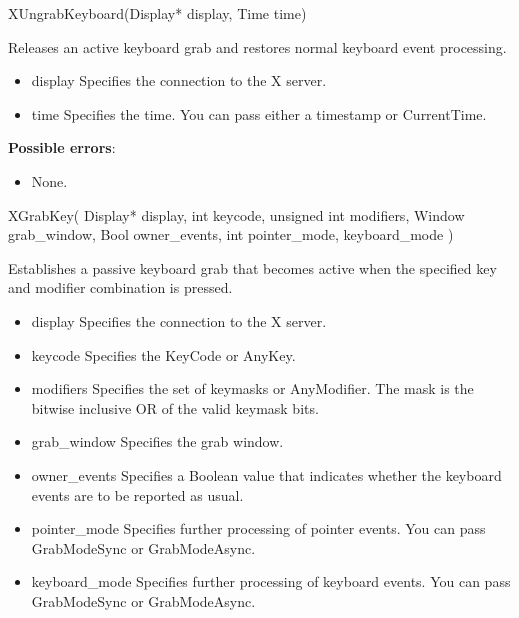 \documentclass{report}
\begin{document}
\begin{itemize}
        \begin{cppcode}
        XUngrabKeyboard(Display* display, Time time)
        \end{cppcode}
        \bigbreak \noindent
        Releases an active keyboard grab and restores normal keyboard event processing.

        \begin{itemize}
            \item display Specifies the connection to the X server.
            \item time Specifies the time. You can pass either a timestamp or CurrentTime.
        \end{itemize}

        \textbf{Possible errors}:
        \begin{itemize}
            \item None.
        \end{itemize}

        \begin{cppcode}
            XGrabKey(
                Display* display,
                int keycode,
                unsigned int modifiers,
                Window grab_window,
                Bool owner_events,
                int pointer_mode, keyboard_mode
            )
        \end{cppcode}
        \bigbreak \noindent
        Establishes a passive keyboard grab that becomes active when the specified key and modifier combination is pressed.

        \begin{itemize}
            \item display Specifies the connection to the X server.
            \item keycode Specifies the KeyCode or AnyKey.
            \item modifiers Specifies the set of keymasks or AnyModifier. The mask is the bitwise inclusive OR of the valid keymask bits.
            \item grab\_window Specifies the grab window.
            \item owner\_events Specifies a Boolean value that indicates whether the keyboard events are to be reported as usual.
            \item pointer\_mode Specifies further processing of pointer events. You can pass GrabModeSync or GrabModeAsync.
            \item keyboard\_mode Specifies further processing of keyboard events. You can pass GrabModeSync or GrabModeAsync.
        \end{itemize}


\end{itemize}
\end{document}
